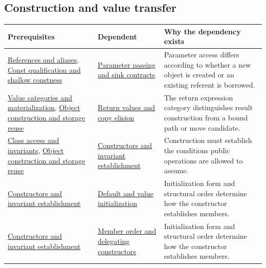 \subsection{Construction and value transfer}\label{appendix-4ad47bdd269a-construction-and-value-transfer}

{\def\LTcaptype{none} %
\begin{longtable}[]{@{}
  >{\raggedright\arraybackslash}p{}
  >{\raggedright\arraybackslash}p{}
  >{\raggedright\arraybackslash}p{}@{}}
\toprule\noalign{}
\begin{minipage}[b]{\linewidth}\raggedright
Prerequisites
\end{minipage} & \begin{minipage}[b]{\linewidth}\raggedright
Dependent
\end{minipage} & \begin{minipage}[b]{\linewidth}\raggedright
Why the dependency exists
\end{minipage} \\
\midrule\noalign{}
\endhead
\bottomrule\noalign{}
\endlastfoot
\hyperref[appendix-d6d562ca9fbb]{References and aliases}, \hyperref[appendix-c25d60fed375]{Const qualification and shallow constness} & \hyperref[appendix-d5908f75721f]{Parameter passing and sink contracts} & Parameter access differs according to whether a new object is created or an existing referent is borrowed. \\
\hyperref[appendix-1121b30eaeb0]{Value categories and materialization}, \hyperref[appendix-a82f9c438857]{Object construction and storage reuse} & \hyperref[appendix-b08d3788c5c6]{Return values and copy elision} & The return expression category distinguishes result construction from a bound path or move candidate. \\
\hyperref[appendix-8e5214819615]{Class access and invariants}, \hyperref[appendix-a82f9c438857]{Object construction and storage reuse} & \hyperref[appendix-7f8ec83d0886]{Constructors and invariant establishment} & Construction must establish the conditions public operations are allowed to assume. \\
\hyperref[appendix-7f8ec83d0886]{Constructors and invariant establishment} & \hyperref[appendix-ba8c1a9fe03f]{Default and value initialization} & Initialization form and structural order determine how the constructor establishes members. \\
\hyperref[appendix-7f8ec83d0886]{Constructors and invariant establishment} & \hyperref[appendix-3cb49709605a]{Member order and delegating constructors} & Initialization form and structural order determine how the constructor establishes members. \\

\end{longtable}}
